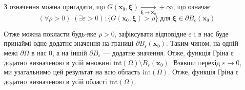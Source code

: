\documentclass{hw_template}
\begin{document}
З означення можна пригадати, що $G(\mathbf{x}_0, \boldsymbol{\xi}) \xrightarrow[\boldsymbol{\xi} \to \mathbf{x}_0]{} +\infty$, що означає
\begin{equation*}
    (\forall \rho > 0) \; (\exists \varepsilon > 0): \{G(\mathbf{x}_0, \boldsymbol{\xi}) > \rho\} \; \text{для $\boldsymbol{\xi} \in \partial B_{\varepsilon}(\mathbf{x}_0)$}
\end{equation*}

Отже можна покласти будь-яке $\rho > 0$, зафіксувати відповідне $\varepsilon$ і в нас буде принаймі одне додатнє значення на границі $\partial B_{\varepsilon}(\mathbf{x}_0)$. Таким чином, на одній межі $\partial\Omega$ в нас $0$, а на іншій $\partial B_{\varepsilon}$ --- додатне значення. Отже, функція Гріна є додатно визначеною в усій множині $\text{int}(\Omega) \setminus B_{\varepsilon}(\mathbf{x}_0)$. Взявши перехід $\varepsilon \to 0$, ми узагальнимо цей результат на всю область $\text{int}(\Omega)$. Отже, функція Гріна є додатно визначеною в усій області $\text{int}(\Omega)$.
\end{document}

